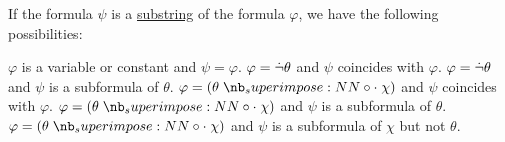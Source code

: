 \begin{lemma}\label{thm:propositional_subformula_lemma}
  If the formula \( \psi \) is a \hyperref[def:formal_language/substring]{substring} of the formula \( \varphi \), we have the following possibilities:
  \begin{thmenum}
     \( \varphi \) is a variable or constant and \( \psi = \varphi \).
     \( \varphi = \dot{\neg} \theta \) and \( \psi \) coincides with \( \varphi \).
     \( \varphi = \dot{\neg} \theta \) and \( \psi \) is a subformula of \( \theta \).
     \( \varphi = (\theta \syncirc \chi) \) and \( \psi \) coincides with \( \varphi \).
     \( \varphi = (\theta \syncirc \chi) \) and \( \psi \) is a subformula of \( \theta \).
     \( \varphi = (\theta \syncirc \chi) \) and \( \psi \) is a subformula of \( \chi \) but not \( \theta \).
  \end{thmenum}
\end{lemma}
